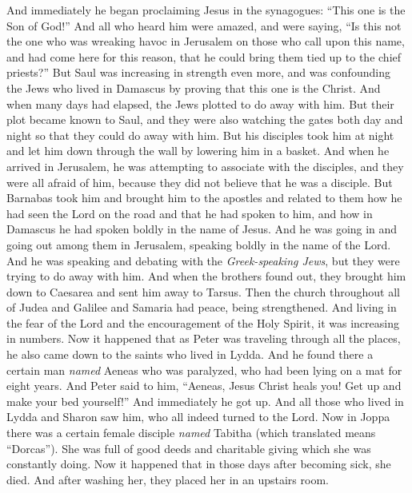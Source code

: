 \begin{biblechapter}
 And immediately he began proclaiming Jesus in the synagogues: “This one is the Son of God!”
\verse And all who heard him were amazed, and were saying, “Is this not the one who was wreaking havoc in Jerusalem on those who call upon this name, and had come here for this reason, that he could bring them tied up to the chief priests?”
\verse But Saul was increasing in strength even more, and was confounding the Jews who lived in Damascus by proving that this one is the Christ.
\verse And when many days had elapsed, the Jews plotted to do away with him.
\verse But their plot became known to Saul, and they were also watching the gates both day and night so that they could do away with him.
\verse But his disciples took him at night and let him down through the wall by lowering him in a basket.
 And when he arrived in Jerusalem, he was attempting to associate with the disciples, and they were all afraid of him, because they did not believe that he was a disciple.
\verse But Barnabas took him and brought him to the apostles and related to them how he had seen the Lord on the road and that he had spoken to him, and how in Damascus he had spoken boldly in the name of Jesus.
\verse And he was going in and going out among them in Jerusalem, speaking boldly in the name of the Lord.
\verse And he was speaking and debating with the \textit{Greek-speaking Jews}, but they were trying to do away with him.
\verse And when the brothers found out, they brought him down to Caesarea and sent him away to Tarsus.
\verse Then the church throughout all of Judea and Galilee and Samaria had peace, being strengthened. And living in the fear of the Lord and the encouragement of the Holy Spirit, it was increasing in numbers.
 Now it happened that as Peter was traveling through all the places, he also came down to the saints who lived in Lydda.
\verse And he found there a certain man \textit{named} Aeneas who was paralyzed, who had been lying on a mat for eight years.
\verse And Peter said to him, “Aeneas, Jesus Christ heals you! Get up and make your bed yourself!” And immediately he got up.
\verse And all those who lived in Lydda and Sharon saw him, who all indeed turned to the Lord.
 Now in Joppa there was a certain female disciple \textit{named} Tabitha (which translated means “Dorcas”). She was full of good deeds and charitable giving which she was constantly doing.
\verse Now it happened that in those days after becoming sick, she died. And after washing her, they placed her in an upstairs room.

\end{biblechapter}
